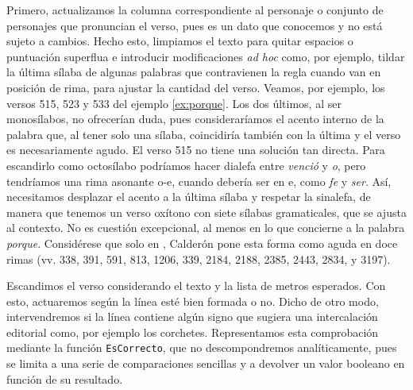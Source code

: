 Primero, actualizamos la columna correspondiente al personaje o conjunto de personajes que pronuncian el verso, pues es un dato que conocemos y no está sujeto a cambios. Hecho esto, limpiamos el texto para quitar espacios o puntuación superflua e introducir modificaciones \textit{ad hoc} como, por ejemplo, tildar la última sílaba de algunas palabras que contravienen la regla cuando van en posición de rima, para ajustar la cantidad del verso. Veamos, por ejemplo, los versos  515, 523 y 533 del ejemplo \ref{ex:porque}. Los dos últimos, al ser monosílabos, no ofrecerían duda, pues consideraríamos el acento interno de la palabra que, al tener solo una sílaba, coincidiría también con la última y el verso es necesariamente agudo. El verso 515 no tiene una solución tan directa. Para escandirlo como octosílabo podríamos hacer dialefa entre \textit{venció} y \textit{o}, pero tendríamos una rima asonante o-e, cuando debería ser en e, como \textit{fe} y \textit{ser}. Así, necesitamos desplazar el acento a la última sílaba y respetar la sinalefa, de manera que tenemos un verso oxítono con siete sílabas gramaticales, que se ajusta al contexto. No es cuestión excepcional, al menos en lo que concierne a la palabra  \textit{porque}. Considérese que solo en , Calderón pone esta forma como aguda en doce rimas (vv. 338, 391, 591, 813, 1206, 339, 2184, 2188, 2385, 2443, 2834,
 y 3197).

Escandimos el verso considerando el texto y la lista de metros esperados. Con esto, actuaremos según la línea esté bien formada o no. Dicho de otro modo, intervendremos si la línea contiene algún signo que sugiera una intercalación editorial como, por ejemplo los corchetes. Representamos esta comprobación mediante la función \texttt{EsCorrecto}, que no descompondremos analíticamente, pues se limita a una serie de comparaciones sencillas y a devolver un valor booleano en función de su resultado.

